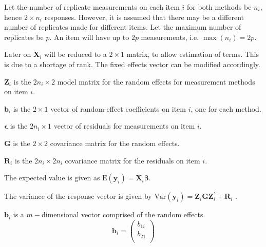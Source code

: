 \documentclass[12pt, a4paper]{report}
\theoremstyle{plain}
\theoremstyle{definition}
\theoremstyle{remark}
\begin{document}
Let the number of replicate measurements on each item $i$ for both methods be $n_i$, hence $2 \times n_i$ responses. However, it is assumed that there may be a different number of replicates made for different items. Let the maximum number of replicates be $p$. An item will have up to $2p$ measurements, i.e. $\max(n_{i}) = 2p$.


Later on $\boldsymbol{X}_i$ will be reduced to a $2 \times 1$ matrix, to allow estimation of terms. This is due to a shortage of rank. The fixed effects vector can be modified accordingly.

$\boldsymbol{Z}_i$ is the $2n_i \times  2$ model matrix for the random effects for measurement methods on item $i$.\\
\bigskip

$\boldsymbol{b}_i$ is the $2 \times  1$ vector of random-effect coefficients on item $i$, one for each method.

$\boldsymbol{\epsilon}$  is the $2n_i \times  1$ vector of residuals for measurements on item $i$.\\
\bigskip

$\boldsymbol{G}$ is the $2 \times  2$ covariance matrix for the random effects.

$\boldsymbol{R}_i$ is the $2n_i \times  2n_i$ covariance matrix for the residuals on item $i$.

The expected value is given as $\mbox{E}(\boldsymbol{y}_i) = \boldsymbol{X}_i\boldsymbol{\beta}.$ \citep{hamlett}\\
\bigskip

The variance of the response vector is given by $\mbox{Var}(\boldsymbol{y}_i)  = \boldsymbol{Z}_i \boldsymbol{G} \boldsymbol{Z}_i^{\prime} + \boldsymbol{R}_i$ \citep{hamlett}.



$\boldsymbol{b}_{i}$ is a $m-$dimensional vector comprised of
the random effects.
\begin{equation}
\boldsymbol{b}_{i} = \left( \begin{array}{c}
b_{1i} \\
b_{21}  \\
\end{array}\right)
\end{equation}
\end{document}
